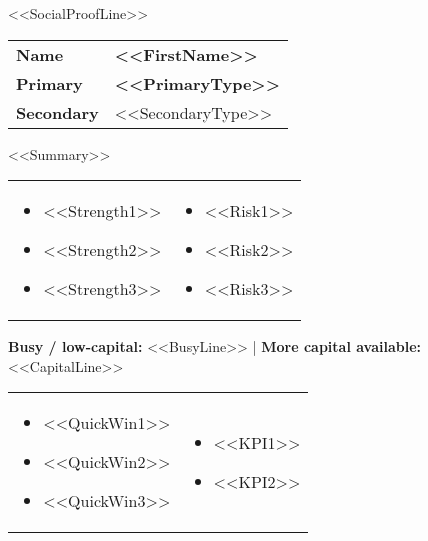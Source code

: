 
{\small \textcolor{textmuted}{<<SocialProofLine>>}}

\begin{tabularx}{\linewidth}{@{} l Y @{}}
\textbf{Name} & \textbf{<<FirstName>>} \\
\textbf{Primary} & \textbf{<<PrimaryType>>} \\
\textbf{Secondary} & <<SecondaryType>> \\
\end{tabularx}

{\small <<Summary>>}

\begin{tabularx}{\linewidth}{@{} Y Y @{}}
\begin{itemize}
  \item <<Strength1>>
  \item <<Strength2>>
  \item <<Strength3>>
\end{itemize}
&
\begin{itemize}
  \item <<Risk1>>
  \item <<Risk2>>
  \item <<Risk3>>
\end{itemize}
\end{tabularx}

{\small \textbf{Busy / low-capital:} <<BusyLine>> \quad | \quad \textbf{More capital available:} <<CapitalLine>>}

\begin{tabularx}{\linewidth}{@{} Y Y @{}}
\begin{itemize}
  \item <<QuickWin1>>
  \item <<QuickWin2>>
  \item <<QuickWin3>>
\end{itemize}
&
\begin{itemize}
  \item <<KPI1>>
  \item <<KPI2>>
\end{itemize}
\end{tabularx}

